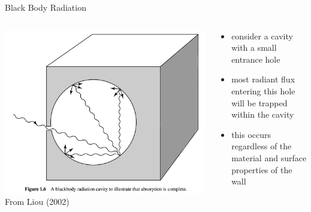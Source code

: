 \begin{frame}{Black Body Radiation}
\begin{columns}[T]
    \begin{column}{.4\textwidth}
    \begin{minipage}[c][0.8\textheight][c]{\linewidth}
    \includegraphics[width=1\textwidth]{fig13.png}\\
    \centering \small From Liou (2002)
    \end{minipage}
    \end{column}
    \begin{column}{.6\textwidth}
    \begin{minipage}[c][0.8\textheight][c]{\linewidth}
   \begin{itemize}
   	\item consider a cavity with a small entrance hole
   	\item most radiant flux entering this hole will be trapped within the cavity
   	\item this occurs regardless of the material and surface properties of the wall
   \end{itemize}
      \end{minipage}
    \end{column}
  \end{columns} 
\end{frame}

